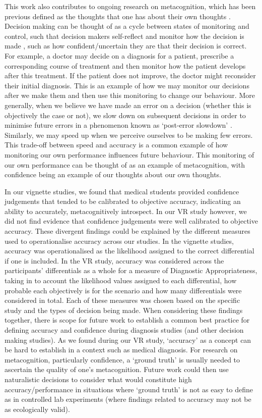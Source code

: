 \documentclass[a4paper, nobind]{templates/ociamthesis}
\begin{document}
This work also contributes to ongoing research on metacognition, which has been previous defined as the thoughts that one has about their own thoughts \autocite{flavell_metacognition_1979}. Decision making can be thought of as a cycle between states of monitoring and control, such that decision makers self-reflect and monitor how the decision is made \autocite{nelson1990}, such as how confident/uncertain they are that their decision is correct. For example, a doctor may decide on a diagnosis for a patient, prescribe a corresponding course of treatment and then monitor how the patient develops after this treatment. If the patient does not improve, the doctor might reconsider their initial diagnosis. This is an example of how we may monitor our decisions after we make them and then use this monitoring to change our behaviour. More generally, when we believe we have made an error on a decision (whether this is objectively the case or not), we slow down on subsequent decisions in order to minimise future errors in a phenomenon known as `post-error slowdown' \autocite{rabbitt_three_1968}. Similarly, we may speed up when we perceive ourselves to be making few errors. This trade-off between speed and accuracy is a common example of how monitoring our own performance influences future behaviour. This monitoring of our own performance can be thought of as an example of metacognition, with confidence being an example of our thoughts about our own thoughts.

In our vignette studies, we found that medical students provided confidence judgements that tended to be calibrated to objective accuracy, indicating an ability to accurately, metacognitively introspect. In our VR study however, we did not find evidence that confidence judgements were well calibrated to objective accuracy. These divergent findings could be explained by the different measures used to operationalise accuracy across our studies. In the vignette studies, accuracy was operationalised as the likelihood assigned to the correct differential if one is included. In the VR study, accuracy was considered across the participants' differentials as a whole for a measure of Diagnostic Appropriateness, taking in to account the likelihood values assigned to each differential, how probable each objectively is for the scenario and how many differentials were considered in total. Each of these measures was chosen based on the specific study and the types of decision being made. When considering these findings together, there is scope for future work to establish a common best practice for defining accuracy and confidence during diagnosis studies (and other decision making studies). As we found during our VR study, `accuracy' as a concept can be hard to establish in a context such as medical diagnosis. For research on metacognition, particularly confidence, a `ground truth' is usually needed to ascertain the quality of one's metacognition. Future work could then use naturalistic decisions to consider what would constitute high accuracy/performance in situations where `ground truth' is not as easy to define as in controlled lab experiments (where findings related to accuracy may not be as ecologically valid).
\end{document}
